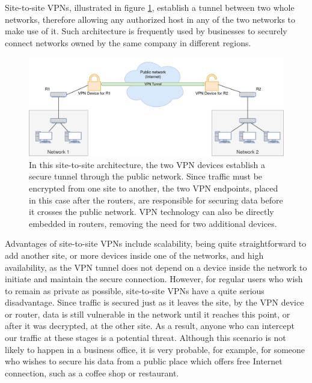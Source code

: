 \documentclass[a4paper,12pt]{report}
\begin{document}
		Site-to-site VPNs, illustrated in figure \ref{fig:site-to-site_VPN}, establish a tunnel between two whole networks, therefore allowing any authorized host in any of the two networks to make use of it. Such architecture is frequently used by businesses to securely connect networks owned by the same company in different regions.
		\begin{figure}[h]
			\includegraphics[width=\textwidth]{site-to-site_VPN}
			\centering
			\caption{In this site-to-site architecture, the two VPN devices establish a secure tunnel through the public network. Since traffic must be encrypted from one site to another, the two VPN endpoints, placed in this case after the routers, are responsible for securing data before it crosses the public network. VPN technology can also be directly embedded in routers, removing the need for two additional devices.}
			\label{fig:site-to-site_VPN}
		\end{figure}
		
		Advantages of site-to-site VPNs include scalability, being quite straightforward to add another site, or more devices inside one of the networks, and high availability, as the VPN tunnel does not depend on a device inside the network to initiate and maintain the secure connection. However, for regular users who wish to remain as private as possible, site-to-site VPNs have a quite serious disadvantage. Since traffic is secured just as it leaves the site, by the VPN device or router, data is still vulnerable in the network until it reaches this point, or after it was decrypted, at the other site. As a result, anyone who can intercept our traffic at these stages is a potential threat. Although this scenario is not likely to happen in a business office, it is very probable, for example, for someone who wishes to secure his data from a public place which offers free Internet connection, such as a coffee shop or restaurant.
		
\end{document}
